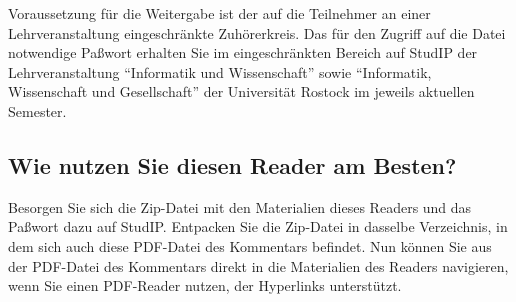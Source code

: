 Voraussetzung für die Weitergabe ist der auf die Teilnehmer an einer Lehrveranstaltung eingeschränkte
Zuhörerkreis.
Das für den Zugriff auf die Datei notwendige Paßwort erhalten Sie im eingeschränkten Bereich auf StudIP
der Lehrveranstaltung \enquote{Informatik und Wissenschaft} sowie
\enquote{Informatik, Wissenschaft und Gesellschaft} der Universität Rostock
im jeweils aktuellen Semester.

\subsection*{Wie nutzen Sie diesen Reader am Besten?}

Besorgen Sie sich die Zip-Datei mit den Materialien dieses Readers 
und das Paßwort dazu auf StudIP.
Entpacken Sie die Zip-Datei in dasselbe Verzeichnis, in dem sich auch diese PDF-Datei des
Kommentars befindet. Nun können Sie aus der PDF-Datei des Kommentars direkt in die Materialien
des Readers navigieren, wenn Sie einen PDF-Reader nutzen, der Hyperlinks unterstützt.


